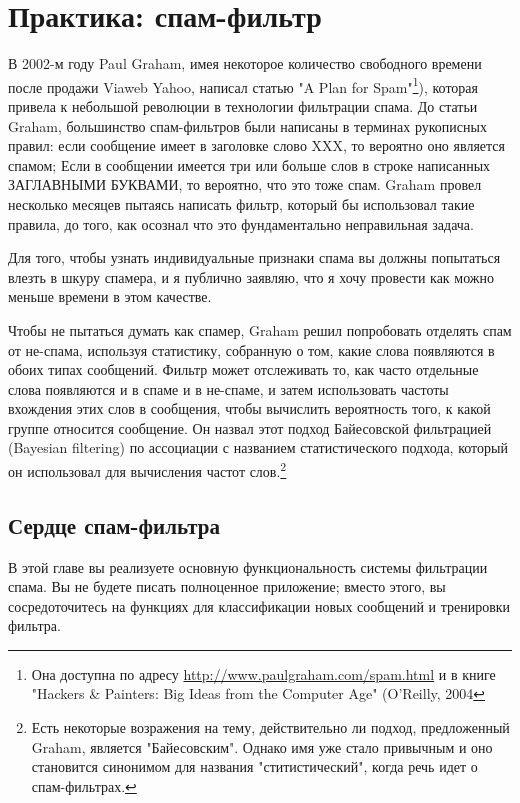 \chapter{Практика: спам-фильтр}
\label{ch:23}

В 2002-м году Paul Graham, имея некоторое количество свободного времени после продажи
Viaweb Yahoo, написал статью "A Plan for Spam"\footnote{Она доступна по адресу
  \url{http://www.paulgraham.com/spam.html} и в книге "Hackers \& Painters: Big Ideas from
  the Computer Age" (O'Reilly, 2004}), которая привела к небольшой революции в технологии
фильтрации спама.  До статьи Graham, большинство спам-фильтров были написаны в терминах
рукописных правил: если сообщение имеет в заголовке слово XXX, то вероятно оно является
спамом; Если в сообщении имеется три или больше слов в строке написанных ЗАГЛАВНЫМИ
БУКВАМИ, то вероятно, что это тоже спам. Graham провел несколько месяцев пытаясь написать
фильтр, который бы использовал такие правила, до того, как осознал что это фундаментально
неправильная задача.

Для того, чтобы узнать индивидуальные признаки спама вы должны попытаться влезть в шкуру
спамера, и я публично заявляю, что я хочу провести как можно меньше времени в этом
качестве.

Чтобы не пытаться думать как спамер, Graham решил попробовать отделять спам от не-спама,
используя статистику, собранную о том, какие слова появляются в обоих типах сообщений.
Фильтр может отслеживать то, как часто отдельные слова появляются и в спаме и в не-спаме,
и затем использовать частоты вхождения этих слов в сообщения, чтобы вычислить вероятность
того, к какой группе относится сообщение.  Он назвал этот подход Байесовской фильтрацией
(Bayesian filtering) по ассоциации с названием статистического подхода, который он
использовал для вычисления частот слов.\footnote{Есть некоторые возражения на тему,
  действительно ли подход, предложенный Graham, является "Байесовским".  Однако имя уже
  стало привычным и оно становится синонимом для названия "ститистический", когда речь
  идет о спам-фильтрах.}

\section{Сердце спам-фильтра}

В этой главе вы реализуете основную функциональность системы фильтрации спама.  Вы не
будете писать полноценное приложение; вместо этого, вы сосредоточитесь на функциях для
классификации новых сообщений и тренировки фильтра.

